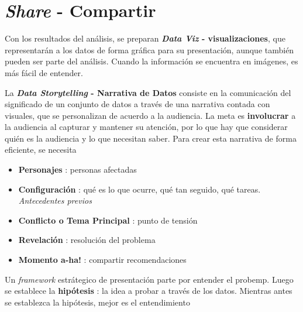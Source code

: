 
\section{\textit{Share} - Compartir}
Con los resultados del análisis, se preparan \textbf{\textit{Data Viz} - visualizaciones}, que representarán a los datos de forma gráfica para su presentación, aunque también pueden ser parte del análisis. Cuando la información se encuentra en imágenes, es más fácil de entender. 

La \textbf{\textit{Data Storytelling} - Narrativa de Datos} consiste en la comunicación del significado de un conjunto de datos a través de una narrativa contada con visuales, que se personalizan de acuerdo a la audiencia. La meta es \textbf{involucrar} a la audiencia al capturar y mantener su atención, por lo que hay que considerar quién es la audiencia y lo que necesitan saber. Para crear esta narrativa de forma eficiente, se necesita
\begin{itemize}
    \item {\textbf{Personajes} : personas afectadas}
    \item {\textbf{Configuración} : qué es lo que ocurre, qué tan seguido, qué tareas. \textit{Antecedentes previos}}
    \item {\textbf{Conflicto o Tema Principal} : punto de tensión}
    \item {\textbf{Revelación} : resolución del problema}
    \item {\textbf{Momento a-ha!} : compartir recomendaciones}
\end{itemize}
Un \textit{framework} estrátegico de presentación parte por entender el \gls{probemp}. Luego se establece la \textbf{hipótesis} : la idea a probar a través de los datos. Mientras antes se establezca la hipótesis, mejor es el entendimiento


